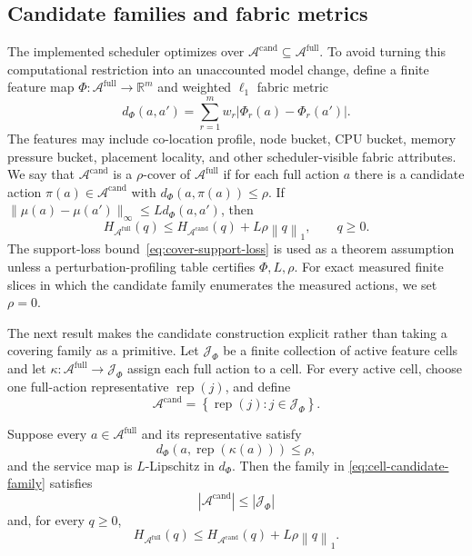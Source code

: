 \documentclass[opre,dblanonrev]{informs4}
\newcommand{\Afull}{\mathcal A^{\mathrm{full}}}
\newcommand{\Acand}{\mathcal A^{\mathrm{cand}}}
\newcommand{\Real}{\mathbb R}
\newcommand{\normone}[1]{\left\|#1\right\|_1}
\begin{document}
\subsection{Candidate families and fabric metrics}
\label{subsec:candidate-cover}

The implemented scheduler optimizes over \(\Acand\subseteq\Afull\).  To avoid
turning this computational restriction into an unaccounted model change, define
a finite feature map \(\Phi:\Afull\to\Real^m\) and weighted \(\ell_1\) fabric metric
\begin{equation}
  d_{\Phi}(a,a')=\sum_{r=1}^m w_r|\Phi_r(a)-\Phi_r(a')|.
\end{equation}
The features may include co-location profile, node bucket, CPU bucket, memory
pressure bucket, placement locality, and other scheduler-visible fabric
attributes.  We say that \(\Acand\) is a \(\rho\)-cover of \(\Afull\) if for each
full action \(a\) there is a candidate action \(\pi(a)\in\Acand\) with
\(d_{\Phi}(a,\pi(a))\le\rho\).  If
\(\|\mu(a)-\mu(a')\|_{\infty}\le L d_{\Phi}(a,a')\), then
\begin{equation}
  H_{\Afull}(q)\le H_{\Acand}(q)+L\rho\normone{q},
  \qquad q\ge0.
  \label{eq:cover-support-loss}
\end{equation}
The support-loss bound~\eqref{eq:cover-support-loss} is used as a theorem
assumption unless a perturbation-profiling table certifies \(\Phi,L,\rho\).  For
exact measured finite slices in which the candidate family enumerates the
measured actions, we set \(\rho=0\).

The next result makes the candidate construction explicit rather than taking a
covering family as a primitive.  Let \(\mathcal J_\Phi\) be a finite collection
of active feature cells and let
\(\kappa:\Afull\to\mathcal J_\Phi\) assign each full action to a cell.  For every
active cell, choose one full-action representative
\(\operatorname{rep}(j)\), and define
\begin{equation}
  \Acand
  =
  \left\{
    \operatorname{rep}(j):j\in\mathcal J_\Phi
  \right\}.
  \label{eq:cell-candidate-family}
\end{equation}

\begin{proposition}
\label{prop:finite-cell-candidate}
Suppose every \(a\in\Afull\) and its representative satisfy
\begin{equation}
  d_\Phi\!\left(a,\operatorname{rep}(\kappa(a))\right)\le\rho,
  \label{eq:cell-radius}
\end{equation}
and the service map is \(L\)-Lipschitz in \(d_\Phi\).  Then the family in
\eqref{eq:cell-candidate-family} satisfies
\begin{equation}
  |\Acand|\le |\mathcal J_\Phi|
  \label{eq:candidate-cardinality}
\end{equation}
and, for every \(q\ge0\),
\begin{equation}
  H_{\Afull}(q)
  \le
  H_{\Acand}(q)+L\rho\normone{q}.
  \label{eq:constructed-cover-support-loss}
\end{equation}
\end{proposition}
\end{document}
